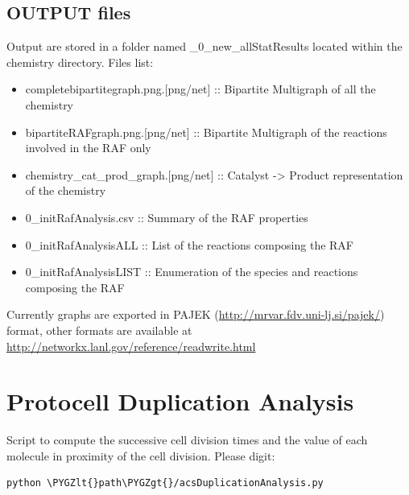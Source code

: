 \documentclass[letterpaper,10pt,english]{sphinxmanual}
\def\PYGZlt{\char`\<}
\def\PYGZgt{\char`\>}
\begin{document}
\subsection{OUTPUT files}
\label{graph_chemistry_analysis:output-files}
Output are stored in a folder named \_0\_new\_allStatResults located within the chemistry directory. 
Files list:
\begin{itemize}
\item {} 
completebipartitegraph.png.{[}png/net{]} :: Bipartite Multigraph of all the chemistry

\item {} 
bipartiteRAFgraph.png.{[}png/net{]} :: Bipartite Multigraph of the reactions involved in the RAF only

\item {} 
chemistry\_cat\_prod\_graph.{[}png/net{]} :: Catalyst -\textgreater{} Product representation of the chemistry

\item {} 
0\_initRafAnalysis.csv :: Summary of the RAF properties

\item {} 
0\_initRafAnalysisALL :: List of the reactions composing the RAF

\item {} 
0\_initRafAnalysisLIST :: Enumeration of the species and reactions composing the RAF

\end{itemize}

Currently graphs are exported in PAJEK (\href{http://mrvar.fdv.uni-lj.si/pajek/}{http://mrvar.fdv.uni-lj.si/pajek/}) format, other formats are available at \href{http://networkx.lanl.gov/reference/readwrite.html}{http://networkx.lanl.gov/reference/readwrite.html}


\section{Protocell Duplication Analysis}
\label{acsDuplicationAnalysis:protocell-duplication-analysis}\label{acsDuplicationAnalysis:module-acsDuplicationAnalysis}\label{acsDuplicationAnalysis::doc}
Script to compute the successive cell division times and the value of each molecule in proximity of the cell division.
Please digit:

\begin{Verbatim}[commandchars=\\\{\}]
python \PYGZlt{}path\PYGZgt{}/acsDuplicationAnalysis.py
\end{Verbatim}
\end{document}
